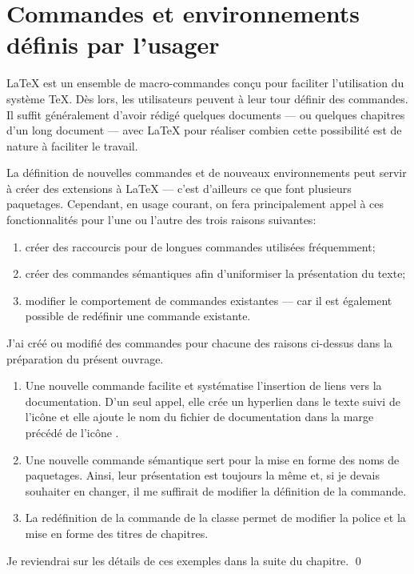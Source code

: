 
\chapter{Commandes et environnements définis par l'usager}
\label{chap:commandes}

{\LaTeX} est un ensemble de macro-commandes conçu pour faciliter
l'utilisation du système {\TeX}. Dès lors, les utilisateurs peuvent à
leur tour définir des commandes. Il suffit généralement d'avoir rédigé
quelques documents --- ou quelques chapitres d'un long document ---
avec {\LaTeX} pour réaliser combien cette possibilité est de nature à
faciliter le travail.

La définition de nouvelles commandes et de nouveaux environnements
peut servir à créer des extensions à {\LaTeX} --- c'est d'ailleurs ce
que font plusieurs paquetages. Cependant, en usage courant, on fera
principalement appel à ces fonctionnalités pour l'une ou l'autre des
trois raisons suivantes:

\begin{enumerate}
\item créer des raccourcis pour de longues commandes utilisées
  fréquemment;
\item créer des commandes sémantiques afin d'uniformiser la
  présentation du texte;
\item modifier le comportement de commandes existantes --- car il est
  également possible de redéfinir une commande existante.
\end{enumerate}

\begin{exemple}
  \label{ex:commandes:intro}
  J'ai créé ou modifié des commandes pour chacune des raisons
  ci-dessus dans la préparation du présent ouvrage.
  \begin{enumerate}
  \item Une nouvelle commande \cmdprint{\doc} facilite et systématise
    l'insertion de liens vers la documentation. D'un seul appel, elle
    crée un hyperlien dans le texte suivi de l'icône {\faExternalLink*}
    et elle ajoute le nom du fichier de documentation dans la marge
    précédé de l'icône {\faBookmark}.
  \item Une nouvelle commande sémantique \cmdprint{\pkg} sert pour la
    mise en forme des noms de paquetages. Ainsi, leur présentation est
    toujours la même et, si je devais souhaiter en changer, il me
    suffirait de modifier la définition de la commande.
  \item La redéfinition de la commande \cmd{\chaptitlefont} de la
    classe  permet de modifier la police et la mise en
    forme des titres de chapitres.
  \end{enumerate}
  Je reviendrai sur les détails de ces exemples dans la suite du
  chapitre. %
  \qed
\end{exemple}


